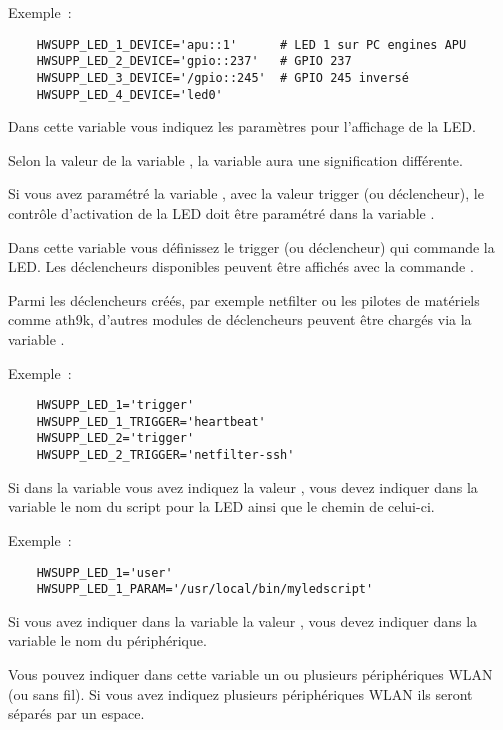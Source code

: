\begin{description}
  Exemple~:
  \begin{verbatim}
    HWSUPP_LED_1_DEVICE='apu::1'      # LED 1 sur PC engines APU
    HWSUPP_LED_2_DEVICE='gpio::237'   # GPIO 237
    HWSUPP_LED_3_DEVICE='/gpio::245'  # GPIO 245 inversé
    HWSUPP_LED_4_DEVICE='led0'
  \end{verbatim}


  Dans cette variable vous indiquez les paramètres pour l'affichage de la LED.

  Selon la valeur de la variable , la variable
   aura une signification différente.

  Si vous avez paramétré la variable , avec la valeur trigger
  (ou déclencheur), le contrôle d'activation de la LED doit être paramétré dans la variable
  .

  Dans cette variable vous définissez le trigger (ou déclencheur) qui commande la LED.
  Les déclencheurs disponibles peuvent être affichés avec la commande
  .

  Parmi les déclencheurs créés, par exemple netfilter ou les pilotes de matériels comme ath9k,
  d'autres modules de déclencheurs peuvent être chargés via la variable .

  Exemple~:
  \begin{verbatim}
    HWSUPP_LED_1='trigger'
    HWSUPP_LED_1_TRIGGER='heartbeat'
    HWSUPP_LED_2='trigger'
    HWSUPP_LED_2_TRIGGER='netfilter-ssh'
  \end{verbatim}

  Si dans la variable  vous avez indiquez la valeur ,
  vous devez indiquer dans la variable  le nom du script pour la LED
  ainsi que le chemin de celui-ci.

  Exemple~:
  \begin{verbatim}
    HWSUPP_LED_1='user'
    HWSUPP_LED_1_PARAM='/usr/local/bin/myledscript'
  \end{verbatim}

  Si vous avez indiquer dans la variable la valeur ,
  vous devez indiquer dans la variable  le nom du périphérique.

  Vous pouvez indiquer dans cette variable un ou plusieurs périphériques WLAN (ou sans fil).
  Si vous avez indiquez plusieurs périphériques WLAN ils seront séparés par un espace.


\end{description}
